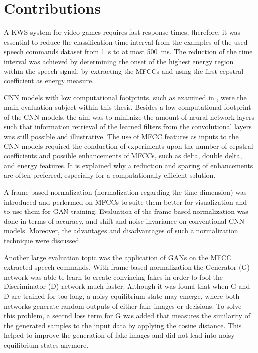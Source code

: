 
\section{Contributions}
A KWS system for video games requires fast response times, therefore, it was essential to reduce the classification time interval from the examples of the used speech commands dataset \cite{Warden2018} from \SI{1}{\second} to at most \SI{500}{\milli\second}.
The reduction of the time interval was achieved by determining the onset of the highest energy region within the speech signal, by extracting the MFCCs and using the first cepstral coefficient as energy measure.

CNN models with low computational footprints, such as examined in \cite{Sainath2015}, were the main evaluation subject within this thesis.
Besides a low computational footprint of the CNN models, the aim was to minimize the amount of neural network layers such that information retrieval of the learned filters from the convolutional layers was still possible and illustrative.
The use of MFCC features as inputs to the CNN models required the conduction of experiments upon the number of cepstral coefficients and possible enhancements of MFCCs, such as delta, double delta, and energy features.
It is explained why a reduction and sparing of enhancements are often preferred, especially for a computationally efficient solution.

A frame-based normalization (normalization regarding the time dimension) was introduced and performed on MFCCs to suite them better for visualization and to use them for GAN training.
Evaluation of the frame-based normalization was done in terms of accuracy, and shift and noise invariance on conventional CNN models.
Moreover, the advantages and disadvantages of such a normalization technique were discussed.

Another large evaluation topic was the application of GANs on the MFCC extracted speech commands. 
With frame-based normalization the Generator (G) network was able to learn to create convincing fakes in order to fool the Discriminator (D) network much faster.
Although it was found that when G and D are trained for too long, a noisy equilibrium state may emerge, where both networks generate random outputs of either fake images or decisions.
To solve this problem, a second loss term for G was added that measures the similarity of the generated samples to the input data by applying the cosine distance.
This helped to improve the generation of fake images and did not lead into noisy equilibrium states anymore.

